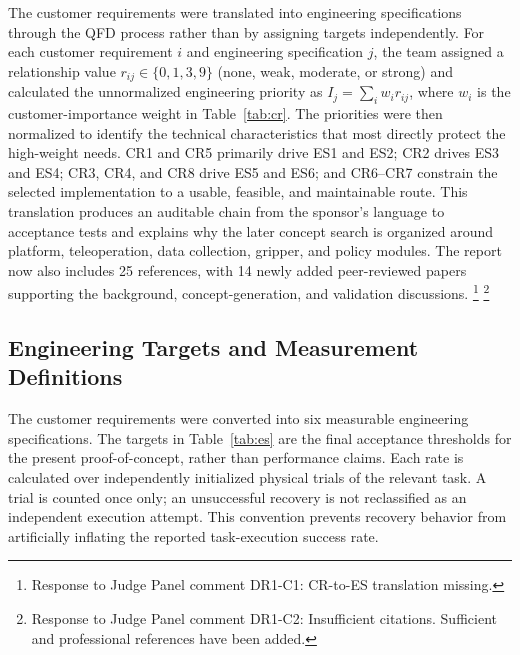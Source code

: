 \documentclass[12pt, letterpaper]{article}
\begin{document}
  {\color{blue!70!black}
  The customer requirements were translated into engineering specifications through the QFD process
  rather than by assigning targets independently. For each customer requirement $i$ and engineering
  specification $j$, the team assigned a relationship value $r_{ij}\in\{0,1,3,9\}$ (none, weak,
  moderate, or strong) and calculated the unnormalized engineering priority as $I_j=\sum_i w_i
  r_{ij}$, where $w_i$ is the customer-importance weight in Table~\ref{tab:cr}. The priorities were
  then normalized to identify the technical characteristics that most directly protect the high-weight
  needs. CR1 and CR5 primarily drive ES1 and ES2; CR2 drives ES3 and ES4; CR3, CR4, and CR8 drive ES5
  and ES6; and CR6--CR7 constrain the selected implementation to a usable, feasible, and maintainable
  route. This translation produces an auditable chain from the sponsor's language to acceptance tests
  and explains why the later concept search is organized around platform, teleoperation, data
  collection, gripper, and policy modules. The report now also includes 25 references, with 14 newly
  added peer-reviewed papers supporting the background, concept-generation, and validation
  discussions.
  }
  \footnote{Response to Judge Panel comment DR1-C1: CR-to-ES translation missing.}
  \footnote{Response to Judge Panel comment DR1-C2: Insufficient citations. Sufficient and professional references have been added.}

\subsection{Engineering Targets and Measurement Definitions}

The customer requirements were converted into six measurable engineering specifications. The targets in Table~\ref{tab:es} are the final acceptance thresholds for the present proof-of-concept, rather than performance claims. Each rate is calculated over independently initialized physical trials of the relevant task. A trial is counted once only; an unsuccessful recovery is not reclassified as an independent execution attempt. This convention prevents recovery behavior from artificially inflating the reported task-execution success rate.
\end{document}
